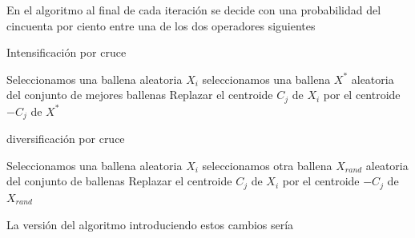 \documentclass[11pt]{article}
\begin{document}
En el algoritmo al final de cada iteración se decide con una probabilidad del
cincuenta por ciento entre una de los dos operadores siguientes

\begin{algorithm}[H]
  \caption{Intensificación por cruce}
  \label{intensificacion}
  \begin{algorithmic}[1]
    \State Seleccionamos una ballena aleatoria $X_i$
    \State seleccionamos una ballena $X^*$ aleatoria del conjunto de mejores ballenas 
    \State Replazar el centroide $C_j$ de $X_i$ por el centroide $-C_j$ de $X^*$
    \EndFor
    \EndFor    
    \EndProcedure
\end{algorithmic}
\end{algorithm}

\begin{algorithm}[H]
  \caption{diversificación por cruce}
  \label{diversificacion}
  \begin{algorithmic}[1]
    \State Seleccionamos una ballena aleatoria $X_i$
    \State seleccionamos otra ballena $X_{rand}$ aleatoria del conjunto de ballenas 
    \State Replazar el centroide $C_j$ de $X_i$ por el centroide $-C_j$ de $X_{rand}$
    \EndFor
    \EndFor    
    \EndProcedure
\end{algorithmic}
\end{algorithm}

La versión del algoritmo introduciendo estos cambios sería 
\end{document}
